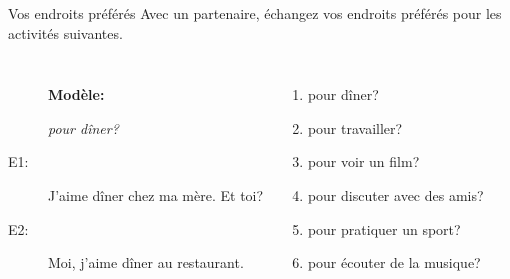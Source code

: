 \documentclass{beamer}
\begin{document}
  \begin{frame}{Vos endroits préférés}
    Avec un partenaire, échangez vos endroits préférés pour les activités suivantes. \\
    \begin{columns}
        \begin{description}
          \item[] \textbf{Modèle:}
          \item[] \emph{pour dîner?}
          \item[E1:] J'aime dîner chez ma mère. Et toi?
          \item[E2:] Moi, j'aime dîner au restaurant.
        \end{description}
        \begin{enumerate}
          \item pour dîner?
          \item pour travailler?
          \item pour voir un film?
          \item pour discuter avec des amis?
          \item pour pratiquer un sport?
          \item pour écouter de la musique?
        \end{enumerate}
    \end{columns}
  \end{frame}
\end{document}
